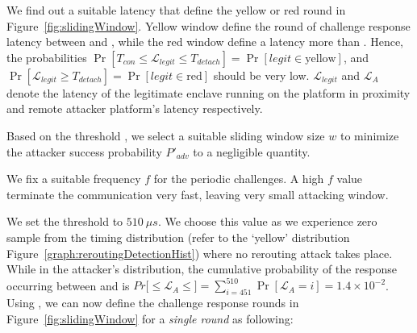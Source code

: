 \begin{mylist}
  \item We find out a suitable latency \detach that define the yellow or red round in Figure~\ref{fig:slidingWindow}. Yellow window define the round of challenge response latency between \connect and \detach, while the red window define a latency more than \detach. Hence, the probabilities $\Pr[T_{con}\leq \mathcal{L}_{legit}\leq T_{detach}]=\Pr[legit\in\text{yellow}]$, and $\Pr[\mathcal{L}_{legit} \geq T_{detach}]=\Pr[legit\in\text{red}]$ should be very low. $\mathcal{L}_{legit}$ and $\mathcal{L}_{A}$ denote the latency of the legitimate enclave running on the platform in proximity and remote attacker platform's latency respectively.
  \item Based on the threshold \detach, we select a suitable sliding window size $w$ to minimize the attacker success probability $P'_{adv}$ to a negligible quantity.
  \item We fix a suitable frequency $f$ for the periodic challenges. A high $f$ value terminate the communication very fast, leaving very small attacking window.
\end{mylist}


\ifusenix
\vspace{-12pt}
\else
\fi
{} We set the threshold \detach to $510\ \mu s$. We choose this value as we experience zero sample from the timing distribution (refer to the `yellow' distribution Figure~\ref{graph:reroutingDetectionHist}) where no rerouting attack takes place. While in the attacker's distribution, the cumulative probability of the response occurring between \connect and \detach is $Pr[$\connect$\leq \mathcal{L}_{A} \leq$\detach$]=\sum_{i=451}^{510}\Pr[\mathcal{L}_{A}=i]=1.4\times10^{-2}$. 
Using \detach, we can now define the challenge response rounds in Figure~\ref{fig:slidingWindow} for a \emph{single round} as following:

